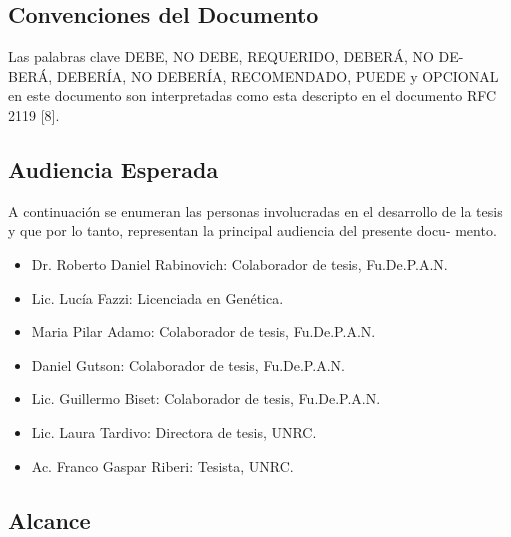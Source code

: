 \documentclass[10pt,a4paper,english,spanish]{article}
\newcommand{\rnaemo}{\textbf{\emph{RNAemo}}}
\begin{document}
\subsection{Convenciones del Documento}
Las palabras clave DEBE, NO DEBE, REQUERIDO, DEBERÁ, NO DE-
BERÁ, DEBERÍA, NO DEBERÍA, RECOMENDADO, PUEDE y OPCIONAL
en este documento son interpretadas como esta descripto en el documento RFC
2119 [8]. 

\subsection{Audiencia Esperada}
\par A continuación se enumeran las personas involucradas en el desarrollo de la
tesis y que por lo tanto, representan la principal audiencia del presente docu-
mento.
\begin{itemize}
	\item Dr. Roberto Daniel Rabinovich: Colaborador de tesis, Fu.De.P.A.N.
	\item Lic. Lucía Fazzi: Licenciada en Genética.
	\item Maria Pilar Adamo: Colaborador de tesis, Fu.De.P.A.N. 
	\item Daniel Gutson: Colaborador de tesis, Fu.De.P.A.N. 
	\item Lic. Guillermo Biset: Colaborador de tesis, Fu.De.P.A.N. 
	\item Lic. Laura Tardivo: Directora de tesis, UNRC. 
	\item Ac. Franco Gaspar Riberi: Tesista, UNRC.
\end{itemize}

\subsection{Alcance}
\end{document}
